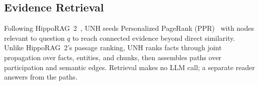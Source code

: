 \documentclass[sigconf, review, anonymous]{acmart}
\newcommand{\sys}{UNH}
\begin{document}






\subsection{Evidence Retrieval}
\label{sec:retrieval}

Following HippoRAG~2~\cite{gutierrez2025rag}, \sys{} seeds Personalized PageRank (PPR)~\cite{haveliwala2002topic} with nodes relevant to question $q$ to reach connected evidence beyond direct similarity. Unlike HippoRAG~2's passage ranking, \sys{} ranks facts through joint propagation over facts, entities, and chunks, then assembles paths over participation and semantic edges. Retrieval makes no LLM call; a separate reader answers from the paths.
\end{document}
